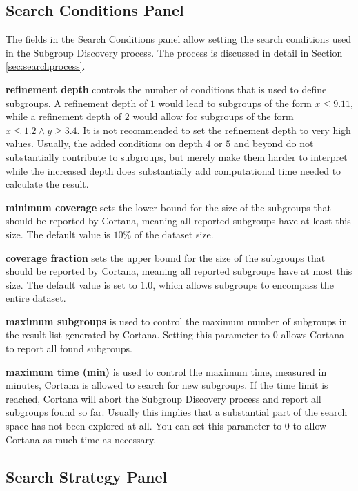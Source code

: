 \documentclass{article}
\begin{document}
\subsection{Search Conditions Panel}
\label{sec:searchconditions}

The fields in the Search Conditions panel allow setting the search
conditions used in the Subgroup Discovery process.  The process is discussed
in detail in Section \ref{sec:searchprocess}.

\textbf{refinement depth} controls the number of conditions that is used to
define subgroups.  A refinement depth of $1$ would lead to subgroups of the
form $x \leq 9.11$, while a refinement depth of $2$ would allow for
subgroups of the form $x \leq 1.2 \wedge y \geq 3.4$.  It is not recommended
to set the refinement depth to very high values.  Usually, the added
conditions on depth $4$ or $5$ and beyond do not substantially contribute to
subgroups, but merely make them harder to interpret while the increased
depth does substantially add computational time needed to calculate the
result.

\textbf{minimum coverage} sets the lower bound for the size of the subgroups
that should be reported by Cortana, meaning all reported subgroups have at
least this size.  The default value is $10\%$ of the dataset size.

\textbf{coverage fraction} sets the upper bound for the size of the
subgroups that should be reported by Cortana, meaning all reported subgroups
have at most this size.  The default value is set to $1.0$, which allows
subgroups to encompass the entire dataset.

\textbf{maximum subgroups} is used to control the maximum number of
subgroups in the result list generated by Cortana.  Setting this parameter
to $0$ allows Cortana to report all found subgroups.

\textbf{maximum time (min)} is used to control the maximum time, measured in
minutes, Cortana is allowed to search for new subgroups.  If the time limit
is reached, Cortana will abort the Subgroup Discovery process and report all
subgroups found so far.  Usually this implies that a substantial part of the
search space has not been explored at all.  You can set this parameter to $0$
to allow Cortana as much time as necessary.

\subsection{Search Strategy Panel}
\label{sec:searchstrategy}
\end{document}
